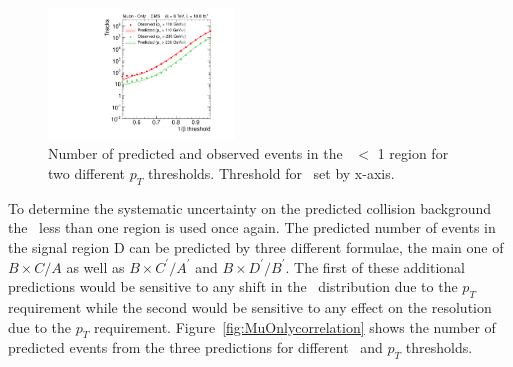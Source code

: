 \begin{figure}
\centering
  \includegraphics[clip=true, trim=0.0cm 0cm 2.8cm 0cm, width=0.44\textwidth]{figures/muonly/Prediction_Data8TeV_NPredVsNObs_Flip}
  \caption[Number of predicted and observed events in the \invbeta\ $<$ 1 region in the \muononly\ analysis]
{Number of predicted and observed events in the \invbeta\ $<$ 1 region for two different $p_T$ thresholds. Threshold for \invbeta\ set by x-axis.}
    \label{fig:PredFlipPt230}
\end{figure}

To determine the systematic uncertainty on the predicted collision background the \invbeta\ less than one region is used once again. The predicted number of events
in the signal region D can be predicted by three different formulae, the main one of $B \times C/A$ as well as 
$B \times C^{\prime}/A^{\prime}$ and $B \times D^{\prime}/B^{\prime}$.
The first of these additional predictions would be sensitive to any shift in the \invbeta\ distribution due to the $p_T$ requirement while the second would be
sensitive to any effect on the resolution due to the $p_T$ requirement. Figure~\ref{fig:MuOnlycorrelation} shows the number of predicted events from the three predictions
for different \invbeta\ and $p_T$ thresholds.


